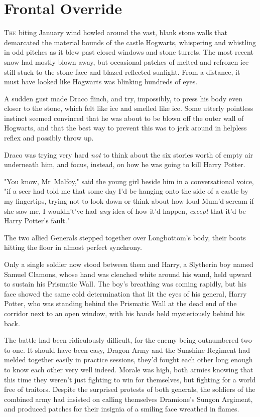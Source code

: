 \chapter{Frontal Override}

\lettrine{T}{he} biting
January wind howled around the vast, blank stone walls that demarcated the
material bounds of the castle Hogwarts, whispering and whistling in odd pitches
as it blew past closed windows and stone turrets. The most recent snow had
mostly blown away, but occasional patches of melted and refrozen ice still
stuck to the stone face and blazed reflected sunlight. From a distance, it must
have looked like Hogwarts was blinking hundreds of eyes.

A sudden gust made Draco flinch, and try, impossibly, to press his body even
closer to the stone, which felt like ice and smelled like ice. Some utterly
pointless instinct seemed convinced that he was about to be blown off the outer
wall of Hogwarts, and that the best way to prevent this was to jerk around in
helpless reflex and possibly throw up.

Draco was trying very hard \emph{not} to think about the six stories worth of
empty air underneath him, and focus, instead, on how he was going to kill Harry
Potter.

"You know, Mr~Malfoy," said the young girl beside him in a conversational
voice, "if a seer had told me that some day I'd be hanging onto the side of a
castle by my fingertips, trying not to look down or think about how loud Mum'd
scream if she saw me, I wouldn't've had \emph{any} idea of how it'd happen,
\emph{except} that it'd be Harry Potter's fault."

The two allied Generals stepped together over Longbottom's body, their boots
hitting the floor in almost perfect synchrony.

Only a single soldier now stood between them and Harry, a Slytherin boy named
Samuel Clamons, whose hand was clenched white around his wand, held upward to
sustain his Prismatic Wall. The boy's breathing was coming rapidly, but his
face showed the same cold determination that lit the eyes of his general, Harry
Potter, who was standing behind the Prismatic Wall at the dead end of the
corridor next to an open window, with his hands held mysteriously behind his
back.

The battle had been ridiculously difficult, for the enemy being outnumbered
two-to-one. It should have been easy, Dragon Army and the Sunshine Regiment had
melded together easily in practice sessions, they'd fought each other long
enough to know each other very well indeed. Morale was high, both armies
knowing that this time they weren't just fighting to win for themselves, but
fighting for a world free of traitors. Despite the surprised protests of both
generals, the soldiers of the combined army had insisted on calling themselves
Dramione's Sungon Argiment, and produced patches for their insignia of a
smiling face wreathed in flames.

